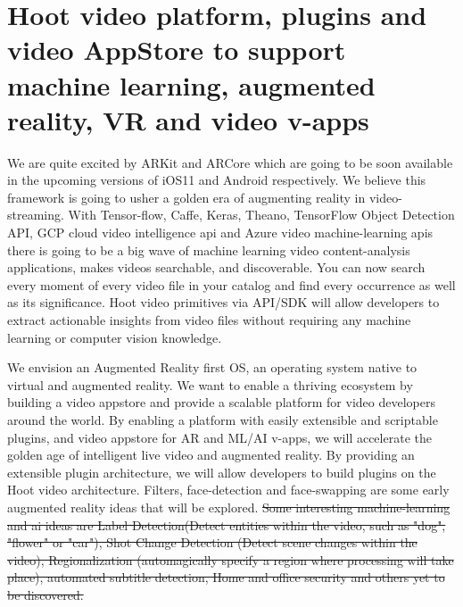 \documentclass{article}
\begin{document}



\iffalse
\section{Hoot video platform, plugins and video AppStore to support machine learning,
 augmented reality, VR and video v-apps}
We are quite excited by ARKit and ARCore which are going to be soon available in the upcoming versions of iOS11 and Android respectively. We believe this framework is going to usher a golden era of augmenting reality in video-streaming. With Tensor-flow, Caffe, Keras, Theano, TensorFlow Object Detection API, GCP cloud video intelligence api and Azure video machine-learning apis there is going to be a big wave of machine learning video content-analysis applications, makes videos searchable, and discoverable. You can now search every moment of every video file in your catalog and find every occurrence as well as its significance. Hoot video primitives via API/SDK will allow developers to extract actionable insights from video files without requiring any machine learning or computer vision knowledge. 

We envision an Augmented Reality first OS, an operating system native to virtual and augmented reality. We want to enable a thriving ecosystem by building a video appstore and provide a scalable platform for video developers around the world. By enabling a platform with easily extensible and scriptable plugins, and video appstore for AR and ML/AI v-apps, we will accelerate the golden age of intelligent live video and augmented reality. By providing an extensible plugin architecture, we will allow developers to build plugins on the Hoot video architecture. Filters, face-detection and face-swapping are some early augmented reality ideas that will be explored. 
\sout{Some interesting machine-learning and ai ideas are Label Detection(Detect entities within the video, such as "dog", "flower" or "car"), Shot Change Detection (Detect scene changes within the video), Regionalization (automagically specify a region where processing will take place), automated subtitle detection, Home and office security and others yet to be discovered.} 
\end{document}
